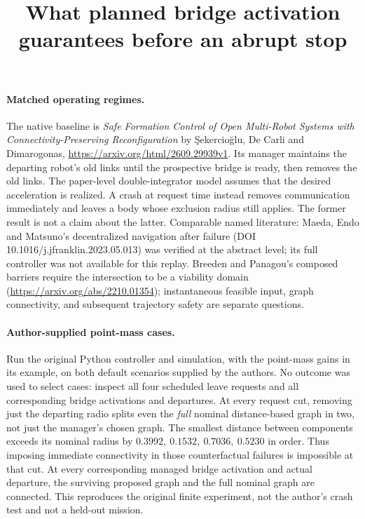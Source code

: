 \documentclass{article}
\title{What planned bridge activation guarantees before an abrupt stop}
\begin{document}
\maketitle
\paragraph{Matched operating regimes.}
The native baseline is \emph{Safe Formation Control of Open Multi-Robot Systems with Connectivity-Preserving Reconfiguration} by \c{S}ekercio\u{g}lu, De Carli and Dimarogonas, \url{https://arxiv.org/html/2609.29939v1}. Its manager maintains the departing robot's old links until the prospective bridge is ready, then removes the old links. The paper-level double-integrator model assumes that the desired acceleration is realized. A crash at request time instead removes communication immediately and leaves a body whose exclusion radius still applies. The former result is not a claim about the latter. Comparable named literature: Maeda, Endo and Matsuno's decentralized navigation after failure (DOI 10.1016/j.jfranklin.2023.05.013) was verified at the abstract level; its full controller was not available for this replay. Breeden and Panagou's composed barriers require the intersection to be a viability domain (\url{https://arxiv.org/abs/2210.01354}); instantaneous feasible input, graph connectivity, and subsequent trajectory safety are separate questions.

\paragraph{Author-supplied point-mass cases.}
Run the original Python controller and simulation, with the point-mass gains in its example, on both default scenarios supplied by the authors. No outcome was used to select cases: inspect all four scheduled leave requests and all corresponding bridge activations and departures. At every request cut, removing just the departing radio splits even the \emph{full} nominal distance-based graph in two, not just the manager's chosen graph. The smallest distance between components exceeds its nominal radius by \(0.3992,\ 0.1532,\ 0.7036,\ 0.5230\) in order. Thus imposing immediate connectivity in those counterfactual failures is impossible at that cut. At every corresponding managed bridge activation and actual departure, the surviving proposed graph and the full nominal graph are connected. This reproduces the original finite experiment, not the author's crash test and not a held-out mission.
\end{document}

